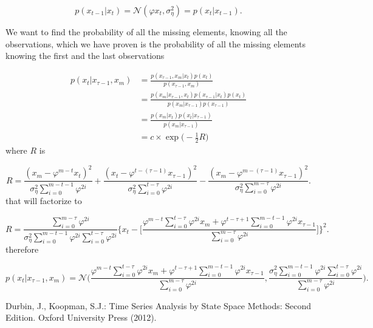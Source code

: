 \documentclass[11pt,a4paper]{article}
\begin{document}
{\[
    p(x_{t-1} | x_t) = \mathcal{N}(\varphi x_t, \sigma^2_\eta) = p(x_t | x_{t-1}).
\]

We want to find the probability of all the missing elements, knowing all the observations, which we have proven is the probability of all the missing elements knowing the first and the last observations

\begin{align*}
    p(x_t | x_{\tau-1}, x_m) &= \frac{p(x_{\tau-1}, x_m | x_t) p(x_t)}{p(x_{\tau-1}, x_m)} \\
    &= \frac{p(x_m | x_{\tau-1}, x_t) p(x_{\tau-1} | x_t) p(x_t)}{p(x_m | x_{\tau-1}) p(x_{\tau-1})} \\
    &= \frac{p(x_m | x_t) p(x_t | x_{\tau-1})}{p(x_m | x_{\tau-1})} \\
    &= c\times \exp\Big(-\frac{1}{2} R\Big)
\end{align*}
where $R$ is

\[
    R = \frac{(x_m - \varphi^{m-t} x_t)^2}{\sigma^2_\eta \sum_{i=0}^{m-t-1} \varphi^{2i}} + \frac{(x_t - \varphi^{t-(\tau-1)} x_{\tau-1})^2}{\sigma^2_\eta \sum_{i=0}^{t-\tau} \varphi^{2i}} - \frac{(x_m - \varphi^{m -(\tau-1)} x_{\tau-1})^2}{\sigma^2_\eta \sum_{i=0}^{m-\tau} \varphi^{2i}}.
\]
that will factorize to

\[
    R = \frac{\sum_{i=0}^{m-\tau} \varphi^{2i}}{\sigma^2_\eta \sum_{i=0}^{m-t-1} \varphi^{2i} \sum_{i=0}^{t-\tau} \varphi^{2i}} \Bigg\{ x_t - \Bigg[\frac{\varphi^{m-t} \sum_{i=0}^{t-\tau} \varphi^{2i} x_{m} + \varphi^{t-\tau+1} \sum_{i=0}^{m-t-1} \varphi^{2i} x_{\tau-1}}{\sum_{i=0}^{m-\tau} \varphi^{2i}}\Bigg] \Bigg\}^2.
\]
therefore

\[
    p(x_t | x_{\tau-1}, x_{m}) = \mathcal{N} \Bigg(\frac{\varphi^{m-t} \sum_{i=0}^{t-\tau} \varphi^{2i} x_{m} + \varphi^{t-\tau+1} \sum_{i=0}^{m-t-1} \varphi^{2i} x_{\tau-1}}{\sum_{i=0}^{m-\tau} \varphi^{2i}}, \frac{\sigma^2_\eta \sum_{i=0}^{m-t-1} \varphi^{2i} \sum_{i=0}^{t-\tau} \varphi^{2i}}{\sum_{i=0}^{m-\tau} \varphi^{2i}} \Bigg).
\]




}

\begin{thebibliography}{}

Durbin, J., Koopman, S.J.: Time Series Analysis by State Space Methods: Second Edition. Oxford University Press (2012). 

\end{thebibliography}
\end{document}
